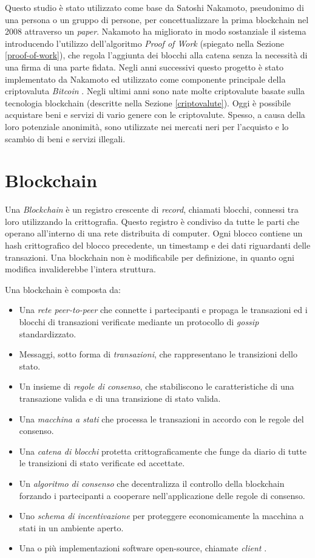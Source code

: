 Questo studio è stato utilizzato come base da Satoshi Nakamoto, pseudonimo di una persona o un gruppo di persone, per concettualizzare la prima blockchain nel 2008 attraverso un \emph{paper}. Nakamoto ha migliorato in modo sostanziale il sistema introducendo l'utilizzo dell'algoritmo \emph{Proof of Work} (spiegato nella Sezione \ref{proof-of-work}), che regola l'aggiunta dei blocchi alla catena senza la necessità di una firma di una parte fidata. Negli anni successivi questo progetto è stato implementato da Nakamoto ed utilizzato come componente principale della criptovaluta \emph{Bitcoin} \cite{blockchain}.
Negli ultimi anni sono nate molte criptovalute basate sulla tecnologia blockchain (descritte nella Sezione \ref{criptovalute}). Oggi è possibile acquistare beni e servizi di vario genere con le criptovalute. Spesso, a causa della loro potenziale anonimità, sono utilizzate nei mercati neri per l'acquisto e lo scambio di beni e servizi illegali.

\section{Blockchain}
\label{blockchain}
Una \emph{Blockchain} è un registro crescente di \emph{record}, chiamati blocchi, connessi tra loro utilizzando la crittografia. Questo registro è condiviso da tutte le parti che operano all'interno di una rete distribuita di computer. Ogni blocco contiene un hash crittografico del blocco precedente, un timestamp e dei dati riguardanti delle transazioni. Una blockchain non è modificabile per definizione, in quanto ogni modifica invaliderebbe l'intera struttura.

Una blockchain è composta da:
\begin{itemize}
    \item Una \emph{rete peer-to-peer} che connette i partecipanti e propaga le transazioni ed i blocchi di transazioni verificate mediante un protocollo di \emph{gossip} standardizzato.
    \item Messaggi, sotto forma di \emph{transazioni}, che rappresentano le transizioni dello stato.
    \item Un insieme di \emph{regole di consenso}, che stabiliscono le caratteristiche di una transazione valida e di una transizione di stato valida.
    \item Una \emph{macchina a stati} che processa le transazioni in accordo con le regole del consenso.
    \item Una \emph{catena di blocchi} protetta crittograficamente che funge da diario di tutte le transizioni di stato verificate ed accettate.
    \item Un \emph{algoritmo di consenso} che decentralizza il controllo della blockchain forzando i partecipanti a cooperare nell'applicazione delle regole di consenso.
    \item Uno \emph{schema di incentivazione} per proteggere economicamente la macchina a stati in un ambiente aperto.
    \item Una o più implementazioni software open-source, chiamate \emph{client} \cite{ethereumbook}.
\end{itemize}

